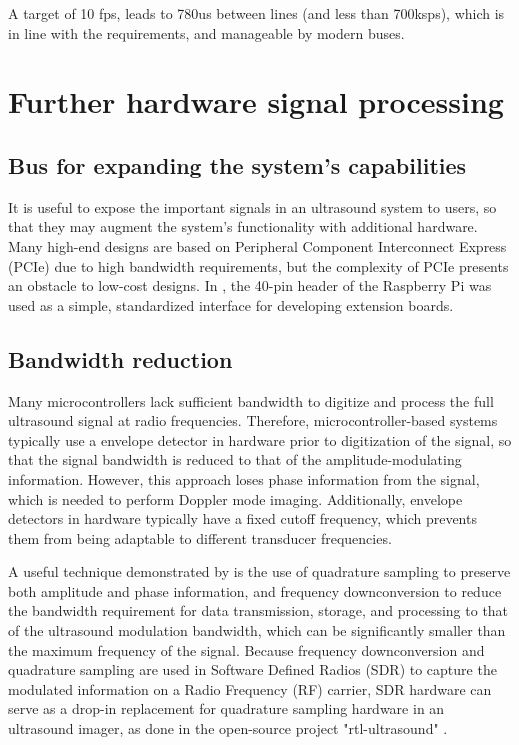 \documentclass{article}
\begin{document}
A target of 10 fps, leads to 780us between lines (and less than 700ksps), which is in line with the requirements, and manageable by modern buses. 



\newpage
\section{Further hardware signal processing}

\subsection{Bus for expanding the system's capabilities}
It is useful to expose the important signals in an ultrasound system to users, so that they may augment the system's functionality with additional hardware. 
Many high-end designs are based on Peripheral Component Interconnect Express (PCIe) due to high bandwidth requirements, but the complexity of PCIe presents an obstacle to low-cost designs.
In \cite{luc_jonveaux_un0rick_2019}, the 40-pin header of the Raspberry Pi was used as a simple, standardized interface for developing extension boards.

\subsection{Bandwidth reduction}
Many microcontrollers lack sufficient bandwidth to digitize and process the full ultrasound signal at radio frequencies. 
Therefore, microcontroller-based systems typically use a envelope detector in hardware prior to digitization of the signal, so that the signal bandwidth is reduced to that of the amplitude-modulating information. However, this approach loses phase information from the signal, which is needed to perform Doppler mode imaging. Additionally, envelope detectors in hardware typically have a fixed cutoff frequency, which prevents them from being adaptable to different transducer frequencies.

A useful technique demonstrated by \cite{peyton_comparison_2018} is the use of quadrature sampling to preserve both amplitude and phase information, and frequency downconversion to reduce the bandwidth requirement for data transmission, storage, and processing to that of the ultrasound modulation bandwidth, which can be significantly smaller than the maximum frequency of the signal. Because frequency downconversion and quadrature sampling are used in Software Defined Radios (SDR) to capture the modulated information on a Radio Frequency (RF) carrier, SDR hardware can serve as a drop-in replacement for quadrature sampling hardware in an ultrasound imager, as done in the open-source project "rtl-ultrasound" \cite{meng_rtl-ultrasound_2019}.
\end{document}
